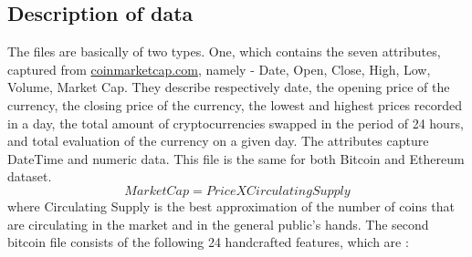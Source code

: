 \documentclass{article}
\begin{document}
\subsection{Description of data}
The files are basically of two types. One, which contains the seven attributes, captured from \url{coinmarketcap.com}, namely - Date, Open, Close, High, Low, Volume, Market Cap. They describe respectively date, the opening price of the currency, the closing price of the currency, the lowest and highest prices recorded in a day, the total amount of cryptocurrencies swapped in the period of 24 hours, and total evaluation of the currency on a given day. The attributes capture DateTime and numeric data. This file is the same for both Bitcoin and Ethereum dataset.
\begin{equation}
    Market Cap = Price X Circulating Supply
\end{equation}
where Circulating Supply is the best approximation of the number of coins that are circulating in the market and in the general public's hands.
\newline
The second bitcoin file consists of the following 24 handcrafted features, which are :
\end{document}
